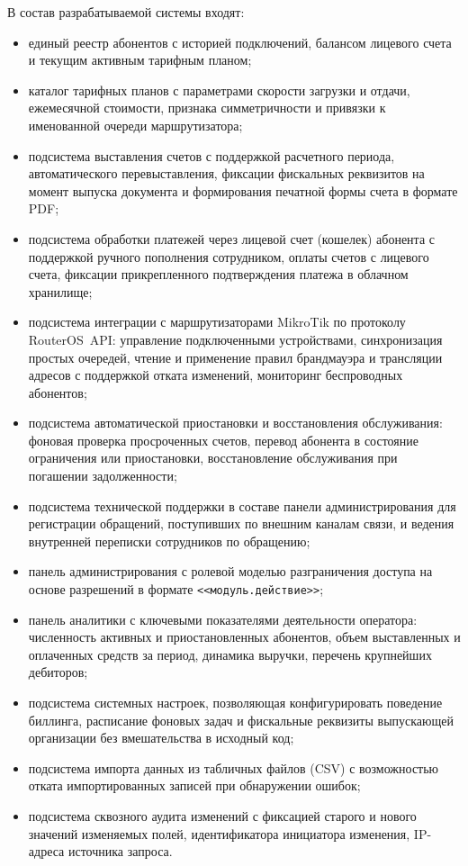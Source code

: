 В состав разрабатываемой системы входят:
\begin{itemize}
\item единый реестр абонентов с историей подключений, балансом лицевого счета и текущим активным тарифным планом;
\item каталог тарифных планов с параметрами скорости загрузки и отдачи, ежемесячной стоимости, признака симметричности и привязки к именованной очереди маршрутизатора;
\item подсистема выставления счетов с поддержкой расчетного периода, автоматического перевыставления, фиксации фискальных реквизитов на момент выпуска документа и формирования печатной формы счета в формате PDF;
\item подсистема обработки платежей через лицевой счет (кошелек) абонента с поддержкой ручного пополнения сотрудником, оплаты счетов с лицевого счета, фиксации прикрепленного подтверждения платежа в облачном хранилище;
\item подсистема интеграции с маршрутизаторами MikroTik по протоколу RouterOS~API: управление подключенными устройствами, синхронизация простых очередей, чтение и применение правил брандмауэра и трансляции адресов с поддержкой отката изменений, мониторинг беспроводных абонентов;
\item подсистема автоматической приостановки и восстановления обслуживания: фоновая проверка просроченных счетов, перевод абонента в состояние ограничения или приостановки, восстановление обслуживания при погашении задолженности;
\item подсистема технической поддержки в составе панели администрирования для регистрации обращений, поступивших по внешним каналам связи, и ведения внутренней переписки сотрудников по обращению;
\item панель администрирования с ролевой моделью разграничения доступа на основе разрешений в формате \texttt{<<модуль.действие>>};
\item панель аналитики с ключевыми показателями деятельности оператора: численность активных и приостановленных абонентов, объем выставленных и оплаченных средств за период, динамика выручки, перечень крупнейших дебиторов;
\item подсистема системных настроек, позволяющая конфигурировать поведение биллинга, расписание фоновых задач и фискальные реквизиты выпускающей организации без вмешательства в исходный код;
\item подсистема импорта данных из табличных файлов (CSV) с возможностью отката импортированных записей при обнаружении ошибок;
\item подсистема сквозного аудита изменений с фиксацией старого и нового значений изменяемых полей, идентификатора инициатора изменения, IP-адреса источника запроса.
\end{itemize}

